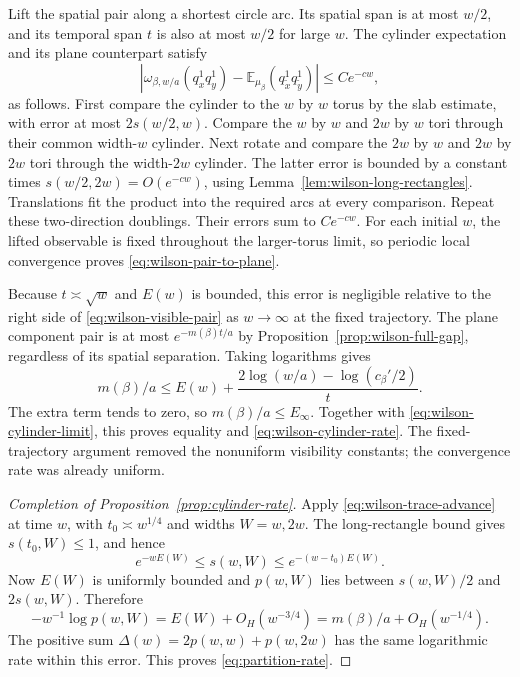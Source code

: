 Lift the spatial pair along a shortest circle arc. Its spatial
span is at most $w/2$, and its temporal span $t$ is also at most
$w/2$ for large $w$. The cylinder expectation and its plane
counterpart satisfy
\begin{equation}
 \left|\omega_{\beta,w/a}(q_x^1q_y^1)
       -\mathbb E_{\mu_\beta}(q_{\widetilde x}^1
                             q_{\widetilde y}^1)\right|
 \le Ce^{-cw},
 \label{eq:wilson-pair-to-plane}
\end{equation}
as follows. First compare the cylinder to the $w$ by $w$
torus by the slab estimate, with error at most $2s(w/2,w)$.
Compare the $w$ by $w$ and $2w$ by $w$ tori through their
common width-$w$ cylinder. Next rotate and compare the
$2w$ by $w$ and $2w$ by $2w$ tori through the width-$2w$
cylinder. The latter error is bounded by a constant times
$s(w/2,2w)=O(e^{-cw})$, using
Lemma~\ref{lem:wilson-long-rectangles}. Translations fit the
product into the required arcs at every comparison.
Repeat these two-direction doublings. Their errors sum to
$Ce^{-cw}$. For each initial $w$, the lifted observable is
fixed throughout the larger-torus limit, so periodic local
convergence proves \eqref{eq:wilson-pair-to-plane}.

Because $t\asymp\sqrt w$ and $E(w)$ is bounded, this error
is negligible relative to the right side of
\eqref{eq:wilson-visible-pair} as $w\to\infty$ at the fixed
trajectory. The plane component pair is at most
$e^{-m(\beta)t/a}$ by Proposition~\ref{prop:wilson-full-gap},
regardless of its spatial separation. Taking logarithms gives
\[
 m(\beta)/a
 \le E(w)+\frac{2\log(w/a)-\log(c_\beta'/2)}{t}.
\]
The extra term tends to zero, so $m(\beta)/a\le E_\infty$.
Together with \eqref{eq:wilson-cylinder-limit}, this proves
equality and \eqref{eq:wilson-cylinder-rate}. The fixed-trajectory
argument removed the nonuniform visibility constants; the
convergence rate was already uniform.

\begin{proof}[Completion of Proposition~\ref{prop:cylinder-rate}]
Apply \eqref{eq:wilson-trace-advance} at time $w$, with
$t_0\asymp w^{1/4}$ and widths $W=w,2w$.
The long-rectangle bound gives $s(t_0,W)\le1$, and hence
\[
 e^{-wE(W)}\le s(w,W)\le e^{-(w-t_0)E(W)}.
\]
Now $E(W)$ is uniformly bounded and $p(w,W)$ lies between
$s(w,W)/2$ and $2s(w,W)$. Therefore
\[
 -w^{-1}\log p(w,W)
 =E(W)+O_H(w^{-3/4})
 =m(\beta)/a+O_H(w^{-1/4}).
\]
The positive sum $\Delta(w)=2p(w,w)+p(w,2w)$ has the same
logarithmic rate within this error. This proves
\eqref{eq:partition-rate}.
\end{proof}
